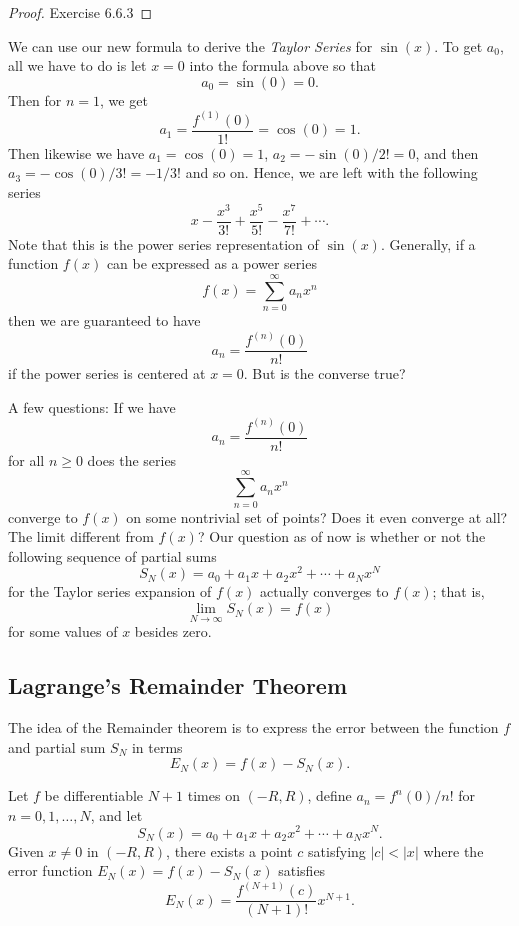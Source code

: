 \begin{proof}
Exercise 6.6.3
\end{proof}

We can use our new formula to derive the \textit{Taylor Series} for \( \sin(x)  \). To get \( a_{0} \), all we have to do is let \( x = 0  \) into the formula above so that 
\[  a_{0} = \sin(0) = 0. \] Then for \( n =1  \), we get 
\[  a_{1} = \frac{ f^{(1)}(0) }{ 1! } = \cos(0) = 1.  \]
Then likewise we have \( a_{1} = \cos(0) = 1  \), \( a_{2} = - \sin(0) / 2! = 0  \), and then \( a_{3} = - \cos(0) / 3! = -1/ 3! \) and so on. Hence, we are left with the following series
\[  x - \frac{ x^{3} }{ 3! }  + \frac{ x^{5} }{ 5! }  - \frac{ x^{7} }{ 7! }  + \dotsb .  \]
Note that this is the power series representation of \( \sin(x)  \). Generally, if a function \( f(x)  \) can be expressed as a power series
\[  f(x) = \sum_{ n=0 }^{ \infty  } a_{n} x^{n} \] then we are guaranteed to have 
\[  a_n = \frac{ f^{(n)}(0) }{ n! } \]
if the power series is centered at \( x = 0  \). But is the converse true? 

A few questions: 
     If we have 
        \[  a_n = \frac{ f^{(n)}(0) }{ n! }  \] for all \( n \geq 0  \) does the series
        \[  \sum_{ n=0 }^{ \infty  } a_n x^{n} \] converge to \( f(x)  \) on some nontrivial set of points?  Does it even converge at all? The limit different from \( f(x)  \)? Our question as of now is whether or not the following sequence of partial sums
        \[  S_{N}(x) = a_{0} + a_{1} x  + a_{2} x^{2} + \dotsb + a_{N} x^{N }  \] for the Taylor series expansion of \( f(x)  \) actually converges to \( f(x)  \); that is, 
        \[ \lim_{ N \to \infty  }  S_{N}(x) = f(x) \]
        for some values of \( x  \) besides zero.

    \subsection{Lagrange's Remainder Theorem}

The idea of the Remainder theorem is to express the error between the function \( f  \) and partial sum \( S_N  \) in terms 
\[  E_N (x) = f(x) - S_N(x).\]

\begin{tcolorbox}
    \begin{thm}
    Let \( f  \) be differentiable \( N + 1  \) times on \( (-R ,R ) \), define \( a_n = f^{n}(0) / n!  \) for \( n = 0, 1 , \dots , N  \), and let 
    \[  S_N(x) = a_0 + a_{1} x + a_{2}x^{2} + \dotsb + a_{N}x^{N}. \]
    Given \( x \neq 0  \) in \( (-R ,R ) \), there exists a point \( c  \) satisfying \( | c  |  < | x  |  \) where the error function \( E_N(x) = f(x) - S_N(x)  \) satisfies 
    \[  E_N(x) = \frac{ f^{(N+1)}(c) }{ (N+1)!  } x^{N+1}. \]
    \end{thm}
\end{tcolorbox}


